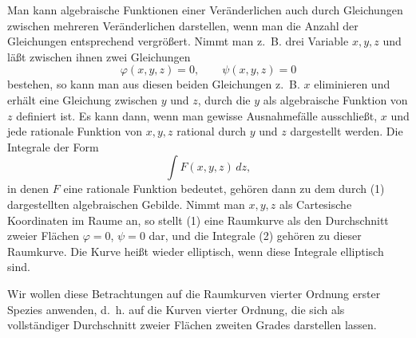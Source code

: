 \documentclass[11pt]{article}
\begin{document}
Man kann algebraische Funktionen einer Veränderlichen auch durch Gleichungen zwischen mehreren Veränderlichen darstellen, wenn man die Anzahl der Gleichungen entsprechend vergrößert. Nimmt man z.~B. drei Variable $x,y,z$ und läßt zwischen ihnen zwei Gleichungen
\begin{equation}
\varphi(x,y,z)=0,\qquad \psi(x,y,z)=0
\tag{1}
\end{equation}
bestehen, so kann man aus diesen beiden Gleichungen z.~B. $x$ eliminieren und erhält eine Gleichung zwischen $y$ und $z$, durch die $y$ als algebraische Funktion von $z$ definiert ist. Es kann dann, wenn man gewisse Ausnahmefälle ausschließt, $x$ und jede rationale Funktion von $x,y,z$ rational durch $y$ und $z$ dargestellt werden. Die Integrale der Form
\begin{equation}
\int F(x,y,z)\,dz,
\tag{2}
\end{equation}
in denen $F$ eine rationale Funktion bedeutet, gehören dann zu dem durch (1) dargestellten algebraischen Gebilde. Nimmt man $x,y,z$ als Cartesische Koordinaten im Raume an, so stellt (1) eine Raumkurve als den Durchschnitt zweier Flächen $\varphi=0$, $\psi=0$ dar, und die Integrale (2) gehören zu dieser Raumkurve. Die Kurve heißt wieder elliptisch, wenn diese Integrale elliptisch sind.

Wir wollen diese Betrachtungen auf die Raumkurven vierter Ordnung erster Spezies anwenden, d.~h. auf die Kurven vierter Ordnung, die sich als vollständiger Durchschnitt zweier Flächen zweiten Grades darstellen lassen.
\end{document}
